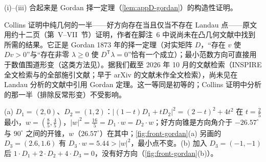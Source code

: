 (i)--(iii) 合起来是 Gordan 择一定理（\cref{lem:appD-gordan}）的构造性证明。

\begin{remark}\label{rem:front-gordan-collins}
Collins 证明中纯几何的一半——好方向存在当且仅当不存在 Landau 点\cite[定理~3]{Collins:2020euz}——原文用约十二页（第~V--VII~节）证明，作者在脚注~6 中说尚未在凸几何文献中找到所需的结果。它正是 Gordan 1873 年的择一定理\cite{Gordan1873}（对实矩阵 $D$，“存在 $v$ 使 $Dv>0$”与“存在非零 $\lambda\ge0$ 使 $D^{\mathsf T}\lambda=0$”恰有一个成立）；最小范数方向可直接用于数值围道形变（这类方法见\cite{Gong:2008ww,Becker:2012nk}）。据我们截至 2026 年 10 月的文献检索（INSPIRE 全文检索与\cite{Collins:2020euz}的全部施引文献；早于 arXiv 的文献未作全文检索），尚未见在 Landau 分析的文献中引用 Gordan 定理。这一等同是初等的；Collins 证明中分析的那一半（排除反常形变）不受影响。
\end{remark}

\begin{example}[二维中的两种情形]\label{ex:front-gordan-2d}
(a) $D_1=(2,0)$、$D_2=(1,2)$：$|(1-t)D_1+tD_2|^2=(2-t)^2+4t^2$ 在 $t=\frac25$ 最小，$w=(\frac85,\frac45)$，$|w|^2=\frac{16}5=D_1\cdot w=D_2\cdot w$；好方向锥是方向角介于 $-26.57^\circ$ 与 $90^\circ$ 之间的开锥，$w$（$26.57^\circ$）在其中；\cref{fig:front-gordan}(a) 另画的 $D_3=(2.6,1.6)$ 有 $D_3\cdot w=5.44>|w|^2$，最小点不变。(b) 加入 $D_3=(-1,-1)$ 后 $1\cdot D_1+2\cdot D_2+4\cdot D_3=0$，没有好方向（\cref{fig:front-gordan}(b)）。
\end{example}

